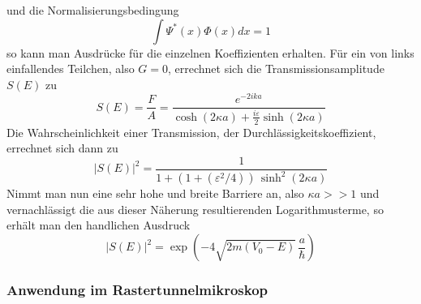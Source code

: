 und die Normalisierungsbedingung
\[
    \int \Psi^* (x) \Phi (x) dx = 1
\]
so kann man Ausdrücke für die einzelnen Koeffizienten erhalten. Für ein von links 
einfallendes Teilchen, also $G=0$, errechnet sich die Transmissionsamplitude 
$S(E)$ zu
\[
    S(E) = \frac{F}{A} = \frac{e^{-2ika}}{\cosh(2\kappa a) + \frac{i \varepsilon}{2}
                               \sinh(2\kappa a)}
\]
Die Wahrscheinlichkeit einer Transmission, der Durchlässigkeitskoeffizient, 
errechnet sich dann zu
\[
    | S(E) |^2 = \frac{1}{1+(1+(\varepsilon^2/4)) \, \sinh^2(2\kappa a)}
\]
Nimmt man nun eine sehr hohe und breite Barriere an, also $\kappa a >> 1$ und 
vernachlässigt die aus dieser Näherung resultierenden Logarithmusterme, so erhält
man den handlichen Ausdruck
\[
    | S(E) |^2 = \exp\left(-4 \sqrt{2m(V_0-E)} \, \frac{a}{\hbar}\right)
\]

        \subsubsection{Anwendung im Rastertunnelmikroskop}

